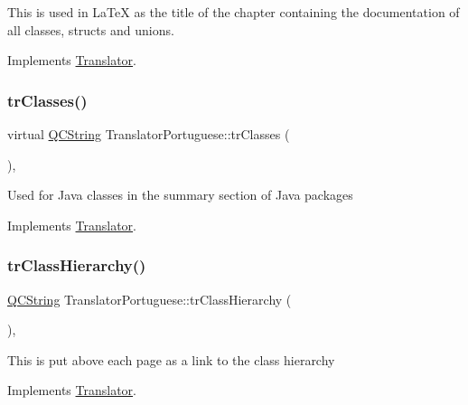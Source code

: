 This is used in La\+TeX as the title of the chapter containing the documentation of all classes, structs and unions. 

Implements \mbox{\hyperlink{class_translator}{Translator}}.

\mbox{\label{class_translator_portuguese_a4579f777e652d05ffd7be1e947d62c01}} 
\subsubsection{\texorpdfstring{trClasses()}{trClasses()}}
{\footnotesize\ttfamily virtual \mbox{\hyperlink{class_q_c_string}{Q\+C\+String}} Translator\+Portuguese\+::tr\+Classes (\begin{DoxyParamCaption}{ }\end{DoxyParamCaption})\hspace{0.3cm}{\ttfamily [inline]}, {\ttfamily [virtual]}}

Used for Java classes in the summary section of Java packages 

Implements \mbox{\hyperlink{class_translator}{Translator}}.

\mbox{\label{class_translator_portuguese_a0e1c63c2d19a6b57fafd403dc92a1cf2}} 
\subsubsection{\texorpdfstring{trClassHierarchy()}{trClassHierarchy()}}
{\footnotesize\ttfamily \mbox{\hyperlink{class_q_c_string}{Q\+C\+String}} Translator\+Portuguese\+::tr\+Class\+Hierarchy (\begin{DoxyParamCaption}{ }\end{DoxyParamCaption})\hspace{0.3cm}{\ttfamily [inline]}, {\ttfamily [virtual]}}

This is put above each page as a link to the class hierarchy 

Implements \mbox{\hyperlink{class_translator}{Translator}}.

\mbox{\label{class_translator_portuguese_aee36524c0b27b8223292c60f3ae48be2}} 
